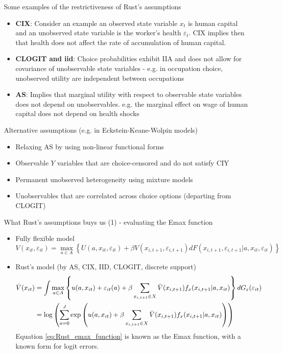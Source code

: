 \documentclass[aspectratio=169]{beamer}
\begin{document}
	
	
	\begin{frame}{Some examples of the restrictiveness of Rust's assumptions}
		\begin{itemize}
			\itemsep1em
			\item \textbf{CIX}: Consider an example an observed state variable $x_t$ is human capital and an unobserved state variable is the worker's health $\varepsilon_t$. CIX implies then that health does not affect the rate of accumulation of human capital.
			\item \textbf{CLOGIT and iid}: Choice probabilities exhibit IIA and does not allow for covariance of unobservable state variables - e.g. in occupation choice, unobserved utility are independent between occupations
			\item \textbf{AS}: Implies that marginal utility with respect to observable state variables does not depend on unobservables. e.g. the marginal effect on wage of human capital does not depend on health shocks
		\end{itemize}
	\end{frame}
	
	\begin{frame}{Alternative assumptions (e.g. in Eckstein-Keane-Wolpin models)}
		\begin{itemize}
			\itemsep1em
			\item Relaxing AS by using non-linear functional forms
			\item Observable $Y$ variables that are choice-censored and do not satisfy CIY
			\item Permanent unobserved heterogeneity using mixture models
			\item Unobservables that are correlated across choice options (departing from CLOGIT)
		\end{itemize}
	\end{frame}
	
	
	\begin{frame}{What Rust's assumptions buys us (1) - evaluating the Emax function}
		\begin{itemize}
			\itemsep1em
			\item Fully flexible model
			$$ V(x_{it},\varepsilon_{it}) = \max_{a \in A} \left\{ U(a,x_{it},\varepsilon_{it}) + \beta V(x_{i,t+1},\varepsilon_{i,t+1}) dF(x_{i,t+1},\varepsilon_{i,t+1}|a,x_{it},\varepsilon_{it}) \right\}$$
			\item Rust's model (by AS, CIX, IID, CLOGIT, discrete support)
			\begin{align}
				\Bar{V}(x_{it}) &= \int \max_{a \in A} \left\{ u(a,x_{it}) + \varepsilon_{it}(a) + \beta \sum_{x_{i,t+1} \in X} \Bar{V}(x_{i,t+1})f_x(x_{i,t+1}|a,x_{it}) \right\} dG_\varepsilon(\varepsilon_{it})       \label{eq:Rust_emax_function} \\    
				&= \log \left( \sum_{a=0}^J \exp \left(u(a,x_{it}) + \beta \sum_{x_{i,t+1} \in X} \Bar{V}(x_{i,t+1})f_x(x_{i,t+1}|a,x_{it}) \right)\right)
			\end{align}
			Equation \ref{eq:Rust_emax_function} is known as the Emax function, with a known form for logit errors.
		\end{itemize}
	\end{frame}
	
\end{document}
